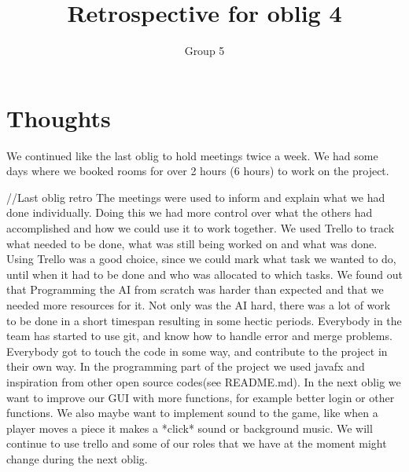 \documentclass{article}
\title{Retrospective for oblig 4}
\author{Group 5}
\date{}
\begin{document}
    \maketitle

    \section{Thoughts}
    \noindent
     We continued like the last oblig to hold meetings twice a week. We had some days where we booked rooms for over 2 hours (6 hours) to work on the project.



     //Last oblig retro
      The meetings were used to inform and explain what we had
     done individually. Doing this we had more control over what the others had accomplished and how we could use it to work together.
     We used Trello to track what needed to be done, what was still being worked on and what was done. Using Trello was a good choice, since we could mark what task we
     wanted to do, until when it had to be done and who was allocated to which tasks. We found out that Programming the AI from scratch was harder than expected
     and that we needed more resources for it. Not only was the AI hard, there was a lot of work to be done in a short timespan
     resulting in some hectic periods. Everybody in the team has started to use git, and know how to handle error and merge problems.
     Everybody got to touch the code in some way, and contribute to the project in their own way. In the programming part of the project
     we used javafx and inspiration from other open source codes(see README.md). In the next oblig we want to
     improve our GUI with more functions, for example better login or other functions. We also maybe want to implement sound to the game, like when a player moves a piece it makes a *click* sound or background music. We will continue to use trello and some of our roles that we have at the moment might change during the next oblig.
\end{document}
